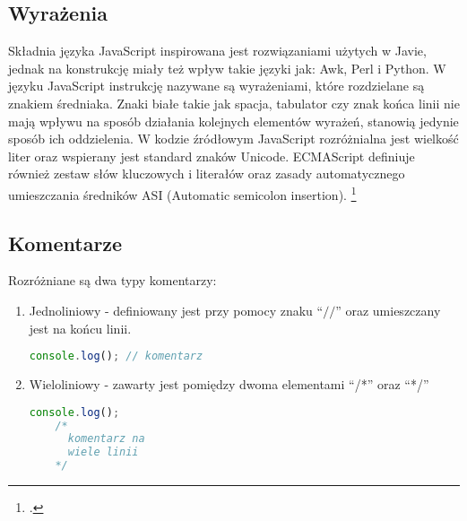 
\subsection{Wyrażenia}

\par Składnia języka JavaScript inspirowana jest rozwiązaniami użytych w Javie, jednak na konstrukcję miały też wpływ takie języki jak: Awk, Perl i Python. W języku JavaScript instrukcję nazywane są wyrażeniami, które rozdzielane są znakiem średniaka. Znaki białe takie jak spacja, tabulator czy znak końca linii nie mają wpływu na sposób działania kolejnych elementów wyrażeń, stanowią jedynie sposób ich oddzielenia. W kodzie źródłowym JavaScript rozróżnialna jest wielkość liter oraz wspierany jest standard znaków Unicode. ECMAScript definiuje również zestaw słów kluczowych i literałów oraz zasady automatycznego umieszczania średników ASI (Automatic semicolon insertion). \footcite{jsGrammar_and_types}


\subsection{Komentarze}

\par Rozróżniane są dwa typy komentarzy:
\begin{enumerate}
  \item Jednoliniowy - definiowany jest przy pomocy znaku ``$//$'' oraz umieszczany jest na końcu linii.
  \begin{lstlisting}[language=JavaScript, caption=Przykład komentarza jednoliniowego, label=alg:komentarze1]
    console.log(); // komentarz
  \end{lstlisting}
  \item Wieloliniowy - zawarty jest pomiędzy dwoma elementami ``/*'' oraz ``*/''
  \begin{lstlisting}[language=JavaScript, caption=Przykład komentarza wieloliniowego, label=alg:komentarze2]
    console.log();
    /*
      komentarz na
      wiele linii
    */
  \end{lstlisting}
\end{enumerate}

